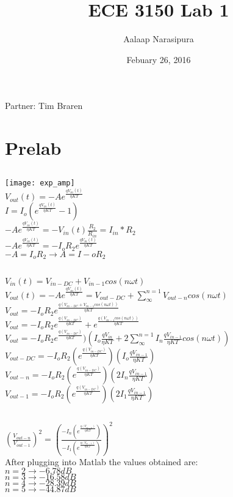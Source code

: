 \documentclass[12pt, oneside]{article}
\title{ECE 3150 Lab 1}
\author{Aalaap Narasipura}
\date{Febuary 26, 2016}							%
\begin{document}
\maketitle
\begin{center}
Partner: Tim Braren
\end{center}
\section{Prelab}
\subsection{}
\begin{center}
\texttt{[image: exp\_amp]}\\
$V_{out}(t)=-Ae^{\frac{qV_{in}(t)}{\eta KT}}$\\$I=I_o(e^{\frac{qV_{in}(t)}{\eta KT}}-1)$\\
$-Ae^{\frac{qV_{in}(t)}{\eta KT}}=-V_{in}(t) \frac{R_2}{R_{in}}=I_{in}*R_2$\\
$-Ae^{\frac{qV_{in}(t)}{\eta KT}}=-I_oR_2e^{\frac{qV_{in}(t)}{\eta KT}}$\\
$-A=I_oR_2\rightarrow A=I-oR_2$
\end{center}
\subsection{}
\begin{center}
$V_{in}(t)=V_{in-DC}+V_{in-1}cos(n\omega t)$\\
$V_{out}(t)=-Ae^{\frac{qV_{in}(t)}{\eta KT}}=V_{out-DC}+\sum\limits_{\infty}^{n=1}V_{out-n}cos(n\omega t)$\\
$V_{out}=-I_oR_2e^{\frac{q(V_{in-DC}+V_{in-1}cos(n\omega t))}{\eta KT}}$\\
$V_{out}=-I_oR_2e^{\frac{q(V_{in-DC})}{\eta KT}}+e^{\frac{q(V_{in-1}cos(n\omega t))}{\eta KT}}$\\
$V_{out}=-I_oR_2e^{\frac{q(V_{in-DC})}{\eta KT}})(I_o\frac{qV_{in}}{\eta KT}+2\sum\limits_{\infty}^{n=1}I_n\frac{qV_{in-1}}{\eta KT}cos(n\omega t))$\\
$V_{out-DC}=-I_oR_2(e^{\frac{q(V_{in-DC})}{\eta KT}})(I_o\frac{qV_{in-1}}{\eta KT})$\\
$V_{out-n}=-I_oR_2(e^{\frac{q(V_{in-DC})}{\eta KT}})(2I_n\frac{qV_{in-1}}{\eta KT})$\\
$V_{out-1}=-I_oR_2(e^{\frac{q(V_{in-DC})}{\eta KT}})(2I_1\frac{qV_{in-1}}{\eta KT})$
\end{center}
\subsection{}
$(\frac{V_{out-n}}{V_{out-1}})^2=(\frac{-I_n(e^{\frac{q(V_{in-n})}{\eta KT}})}{-I_1(e^{\frac{q(V_{in-1})}{\eta KT}})})^2$
\\After plugging into Matlab the values obtained are:\\
$n=2\rightarrow -6.78dB$\\
$n=3\rightarrow -16.58dB$\\
$n=4\rightarrow -28.39dB$\\
$n=5\rightarrow -44.87dB$\\
\end{document}
